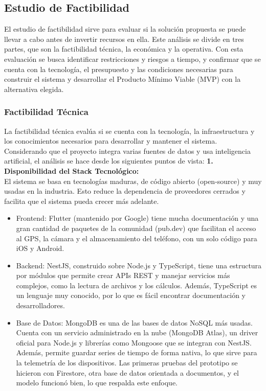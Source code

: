 \subsection{Estudio de Factibilidad}
El estudio de factibilidad sirve para evaluar si la solución propuesta se puede llevar a cabo antes de invertir recursos en ella. Este análisis se divide en tres partes, que son la factibilidad técnica, la económica y la operativa. Con esta evaluación se busca identificar restricciones y riesgos a tiempo, y confirmar que se cuenta con la tecnología, el presupuesto y las condiciones necesarias para construir el sistema y desarrollar el Producto Mínimo Viable (MVP) con la alternativa elegida.

\subsubsection{Factibilidad Técnica}
La factibilidad técnica evalúa si se cuenta con la tecnología, la infraestructura y los conocimientos necesarios para desarrollar y mantener el sistema. Considerando que el proyecto integra varias fuentes de datos y usa inteligencia artificial, el análisis se hace desde los siguientes puntos de vista:
\textbf{1. Disponibilidad del Stack Tecnológico:}\\
El sistema se basa en tecnologías maduras, de código abierto (open-source) y muy usadas en la industria. Esto reduce la dependencia de proveedores cerrados y facilita que el sistema pueda crecer más adelante.
\begin{itemize}
    \item Frontend: Flutter (mantenido por Google) tiene mucha documentación y una gran cantidad de paquetes de la comunidad (pub.dev) que facilitan el acceso al GPS, la cámara y el almacenamiento del teléfono, con un solo código para iOS y Android.
    \item Backend: NestJS, construido sobre Node.js y TypeScript, tiene una estructura por módulos que permite crear APIs REST y manejar servicios más complejos, como la lectura de archivos y los cálculos. Además, TypeScript es un lenguaje muy conocido, por lo que es fácil encontrar documentación y desarrolladores.
    \item Base de Datos: MongoDB es una de las bases de datos NoSQL más usadas. Cuenta con un servicio administrado en la nube (MongoDB Atlas), un driver oficial para Node.js y librerías como Mongoose que se integran con NestJS. Además, permite guardar series de tiempo de forma nativa, lo que sirve para la telemetría de los dispositivos. Las primeras pruebas del prototipo se hicieron con Firestore, otra base de datos orientada a documentos, y el modelo funcionó bien, lo que respalda este enfoque.
\end{itemize}

